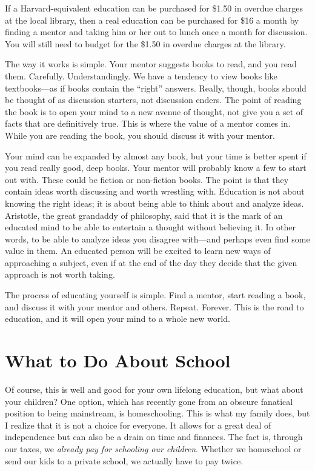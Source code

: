 If a Harvard-equivalent education can be purchased for \$1.50 in overdue
charges at the local library, then a real education can be purchased
for \$16 a month by finding a mentor and taking him or her out to lunch
once a month for discussion. You will still need to budget for the
\$1.50 in overdue charges at the library.

The way it works is simple. Your mentor suggests books to read, and you
read them. Carefully. Understandingly. We have a tendency to view books
like textbooks—as if books contain the “right” answers. Really, though,
books should be thought of as discussion starters, not discussion
enders. The point of reading the book is to open your mind to a new
avenue of thought, not give you a set of facts that are definitively
true. This is where the value of a mentor comes in. While you are
reading the book, you should discuss it with your mentor.

Your mind can be expanded by almost any book, but your time is better
spent if you read really good, deep books. Your mentor will probably
know a few to start out with. These
could be fiction or
non-fiction books. The point is that they contain ideas worth
discussing and worth wrestling with. Education is not about knowing the
right ideas; it is about being able to think about and analyze ideas.
Aristotle, the great grandaddy of philosophy, said that it is the mark
of an educated mind to be able to entertain a thought without believing
it. In other words, to be able to analyze ideas you disagree with—and
perhaps even find some value in them. An educated person will be
excited to learn new ways of approaching a subject, even if at the end
of the day they decide that the given approach is not worth taking.

The process of educating yourself is simple. Find a mentor, start
reading a book, and discuss it with
your mentor and
others. Repeat. Forever. This is the road to education, and it will
open your mind to a whole new world. 

\section{What to Do About School}

Of course, this is well and good for your own lifelong education, but
what about your children?  One option, which has recently gone from an
obscure fanatical position to being mainstream, is homeschooling. This
is what my family does, but I realize that it is not a choice for
everyone. It allows for a great deal of independence but can also be a
drain on time and finances. The fact is, through our taxes, we
\textit{already pay for schooling our children}.
Whether we homeschool
or send our kids to a
private school, we actually have to pay twice. 


